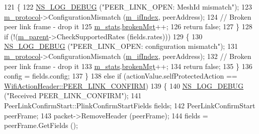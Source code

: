\begin{DoxyCode}
121             \{
122               \hyperlink{group__logging_ga413f1886406d49f59a6a0a89b77b4d0a}{NS\_LOG\_DEBUG} (\textcolor{stringliteral}{"PEER\_LINK\_OPEN:  MeshId mismatch"});
123               \hyperlink{classns3_1_1dot11s_1_1PeerManagementProtocolMac_afbdd1f31cd54c320267ffb3426559095}{m\_protocol}->ConfigurationMismatch (\hyperlink{classns3_1_1dot11s_1_1PeerManagementProtocolMac_a6127e7b929975cae23d8ef639e254991}{m\_ifIndex}, peerAddress);
124               \textcolor{comment}{// Broken peer link frame - drop it}
125               \hyperlink{classns3_1_1dot11s_1_1PeerManagementProtocolMac_aaaccd87941623a8bff20e8998908b518}{m\_stats}.\hyperlink{structns3_1_1dot11s_1_1PeerManagementProtocolMac_1_1Statistics_a7ec552294be33835a15ec7002fe5d723}{brokenMgt}++;
126               \textcolor{keywordflow}{return} \textcolor{keyword}{false};
127             \}
128           \textcolor{keywordflow}{if} (!(\hyperlink{classns3_1_1dot11s_1_1PeerManagementProtocolMac_a14edf9af29af164f967ccc6e77d8ea03}{m\_parent}->CheckSupportedRates (fields.rates)))
129             \{
130               \hyperlink{group__logging_ga413f1886406d49f59a6a0a89b77b4d0a}{NS\_LOG\_DEBUG} (\textcolor{stringliteral}{"PEER\_LINK\_OPEN:  configuration mismatch"});
131               \hyperlink{classns3_1_1dot11s_1_1PeerManagementProtocolMac_afbdd1f31cd54c320267ffb3426559095}{m\_protocol}->ConfigurationMismatch (\hyperlink{classns3_1_1dot11s_1_1PeerManagementProtocolMac_a6127e7b929975cae23d8ef639e254991}{m\_ifIndex}, peerAddress);
132               \textcolor{comment}{// Broken peer link frame - drop it}
133               \hyperlink{classns3_1_1dot11s_1_1PeerManagementProtocolMac_aaaccd87941623a8bff20e8998908b518}{m\_stats}.\hyperlink{structns3_1_1dot11s_1_1PeerManagementProtocolMac_1_1Statistics_a7ec552294be33835a15ec7002fe5d723}{brokenMgt}++;
134               \textcolor{keywordflow}{return} \textcolor{keyword}{false};
135             \}
136           config = fields.config;
137         \}
138       \textcolor{keywordflow}{else} \textcolor{keywordflow}{if} (actionValue.selfProtectedAction == 
      \hyperlink{classns3_1_1WifiActionHeader_a17cfd6c8f685a44e7b7b832cc9a53e83a89961b879d58204ada067ee8dbbde06e}{WifiActionHeader::PEER\_LINK\_CONFIRM})
139         \{
140           \hyperlink{group__logging_ga413f1886406d49f59a6a0a89b77b4d0a}{NS\_LOG\_DEBUG} (\textcolor{stringliteral}{"Received PEER\_LINK\_CONFIRM"});
141           PeerLinkConfirmStart::PlinkConfirmStartFields fields;
142           PeerLinkConfirmStart peerFrame;
143           packet->RemoveHeader (peerFrame);
144           fields = peerFrame.GetFields ();

\end{DoxyCode}
